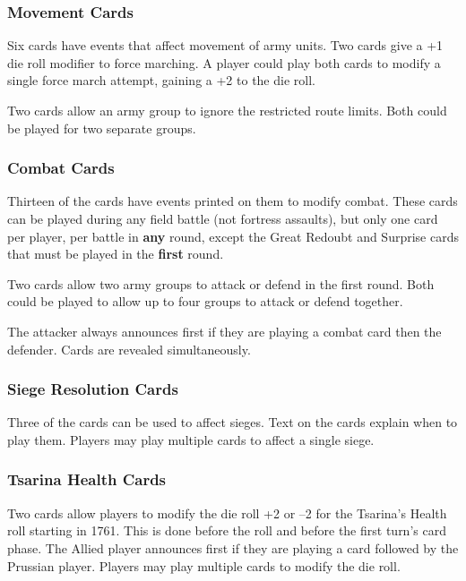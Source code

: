 \subsubsection{Movement Cards}

Six cards have events that affect movement of army units. Two cards give a +1 die roll modifier to force marching. A player could play both cards to modify a single force march attempt, gaining a +2 to the die roll.

Two cards allow an army group to ignore the restricted route limits. Both could be played for two separate groups.

\subsubsection{Combat Cards}

Thirteen of the cards have events printed on them to modify combat. These cards can be played during any field battle (not fortress assaults), but only one card per player, per battle in \textbf{any} round, except the Great Redoubt and Surprise cards that must be played in the \textbf{first} round.

Two cards allow two army groups to attack or defend in the first round. Both could be played to allow up to four groups to attack or defend together.

The attacker always announces first if they are playing a combat card then the defender. Cards are revealed simultaneously.

\subsubsection{Siege Resolution Cards}

Three of the cards can be used to affect sieges. Text on the cards explain when to play them. Players may play multiple cards to affect a single siege.

\subsubsection{Tsarina Health Cards}

Two cards allow players to modify the die roll +2 or –2 for the Tsarina’s Health roll starting in 1761. This is done before the roll and before the first turn’s card phase. The Allied player announces first if they are playing a card followed by the Prussian player. Players may play multiple cards to modify the die roll.

